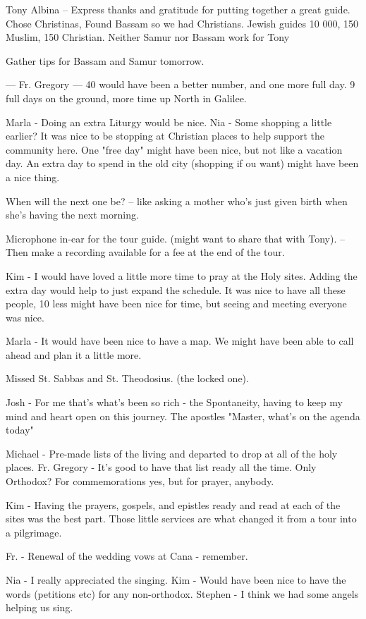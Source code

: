 \documentclass[letterpaper]{report}
\begin{document}
Tony Albina -- Express thanks and gratitude for putting together a great guide.
Chose Christinas, Found Bassam so we had Christians.
Jewish guides 10 000, 150 Muslim, 150 Christian.
Neither Samur nor Bassam work for Tony

Gather tips for Bassam and Samur tomorrow.

--- Fr. Gregory ---
40 would have been a better number, and one more full day. 9 full days on the ground, more time up North in Galilee.

Marla - Doing an extra Liturgy would be nice.
Nia - Some shopping a little earlier? 
    It was nice to be stopping at Christian places to help support the community here.
One "free day" might have been nice, but not like a vacation day. An extra day to spend in the old city (shopping if ou want) might have been a nice thing.

When will the next one be? -- like asking a mother who's just given birth when she's having the next morning.

Microphone in-ear for the tour guide. (might want to share that with Tony). -- Then make a recording available for a fee at the end of the tour.

Kim - I would have loved a little more time to pray at the Holy sites.
    Adding the extra day would help to just expand the schedule.
It was nice to have all these people, 10 less might have been nice for time, but seeing and meeting everyone was nice.

Marla - It would have been nice to have a map.
We might have been able to call ahead and plan it a little more.

Missed St. Sabbas and St. Theodosius. (the locked one).

Josh - For me that's what's been so rich - the Spontaneity, having to keep my mind and heart open on this journey.
  The apostles "Master, what's on the agenda today"

Michael - Pre-made lists of the living and departed to drop at all of the holy places.
   Fr. Gregory - It's good to have that list ready all the time.
Only Orthodox?  For commemorations yes, but for prayer, anybody.

Kim - Having the prayers, gospels, and epistles ready and read at each of the sites was the best part.  Those little services are what changed it from a tour into a pilgrimage.

Fr. - Renewal of the wedding vows at Cana - remember.

Nia - I really appreciated the singing.
Kim - Would have been nice to have the words (petitions etc) for any non-orthodox.
Stephen - I think we had some angels helping us sing.
\end{document}
